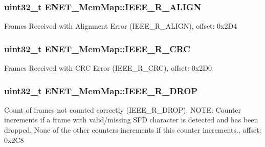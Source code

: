 \subsubsection[{I\+E\+E\+E\+\_\+\+R\+\_\+\+A\+L\+I\+G\+N}]{\setlength{\rightskip}{0pt plus 5cm}uint32\+\_\+t E\+N\+E\+T\+\_\+\+Mem\+Map\+::\+I\+E\+E\+E\+\_\+\+R\+\_\+\+A\+L\+I\+G\+N}\label{struct_e_n_e_t___mem_map_a039b0879213c4f8df06320fd59ec98b5}
Frames Received with Alignment Error (I\+E\+E\+E\+\_\+\+R\+\_\+\+A\+L\+I\+G\+N), offset\+: 0x2\+D4 \hypertarget{struct_e_n_e_t___mem_map_a2255a62e6e3613228e51e17de6fa7857}{}
\subsubsection[{I\+E\+E\+E\+\_\+\+R\+\_\+\+C\+R\+C}]{\setlength{\rightskip}{0pt plus 5cm}uint32\+\_\+t E\+N\+E\+T\+\_\+\+Mem\+Map\+::\+I\+E\+E\+E\+\_\+\+R\+\_\+\+C\+R\+C}\label{struct_e_n_e_t___mem_map_a2255a62e6e3613228e51e17de6fa7857}
Frames Received with C\+R\+C Error (I\+E\+E\+E\+\_\+\+R\+\_\+\+C\+R\+C), offset\+: 0x2\+D0 \hypertarget{struct_e_n_e_t___mem_map_ab6094b200bfd511ba0565eb3998d84a7}{}
\subsubsection[{I\+E\+E\+E\+\_\+\+R\+\_\+\+D\+R\+O\+P}]{\setlength{\rightskip}{0pt plus 5cm}uint32\+\_\+t E\+N\+E\+T\+\_\+\+Mem\+Map\+::\+I\+E\+E\+E\+\_\+\+R\+\_\+\+D\+R\+O\+P}\label{struct_e_n_e_t___mem_map_ab6094b200bfd511ba0565eb3998d84a7}
Count of frames not counted correctly (I\+E\+E\+E\+\_\+\+R\+\_\+\+D\+R\+O\+P). N\+O\+T\+E\+: Counter increments if a frame with valid/missing S\+F\+D character is detected and has been dropped. None of the other counters increments if this counter increments., offset\+: 0x2\+C8 \hypertarget{struct_e_n_e_t___mem_map_ae17f87f4ba066274bc113b3dfac5a635}{}
